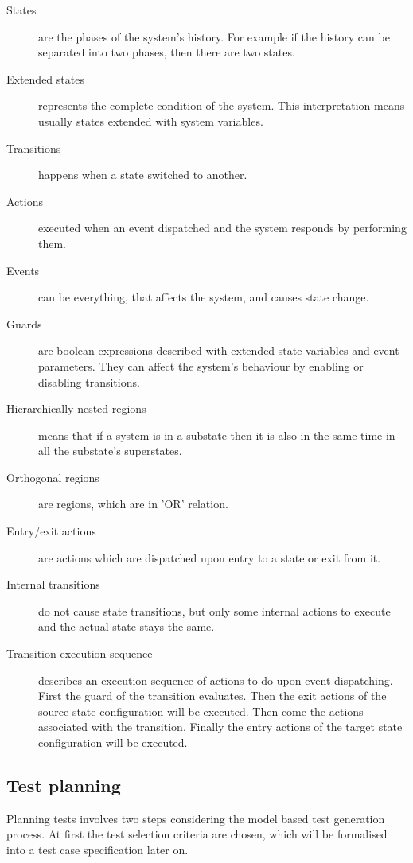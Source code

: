 \begin{description}
	\item[States] are the phases of the system's history. For example if the history can be separated into two phases, then there are two states. 
	\item[Extended states] represents the complete condition of the system. This interpretation means usually states extended with system variables.
	\item[Transitions] happens when a state switched to another.
	\item[Actions] executed when an event dispatched and the system responds by performing them.
	\item[Events] can be everything, that affects the system, and causes state change.
	\item[Guards] are boolean expressions described with extended state variables and event parameters. They can affect the system's behaviour by enabling or disabling transitions.
	\item[Hierarchically nested regions] means that if a system is in a substate then it is also in the same time in all the substate's superstates.
	\item[Orthogonal regions] are regions, which are in 'OR' relation.
	\item[Entry/exit actions] are actions which are dispatched upon entry to a state or exit from it.
	\item[Internal transitions] do not cause state transitions, but only some internal actions to execute and the actual state stays the same.
	\item[Transition execution sequence] describes an execution sequence of actions to do upon event dispatching. First the guard of the transition evaluates. Then the exit actions of the source state configuration will be executed. Then come the actions associated with the transition. Finally the entry actions of the target state configuration will be executed.
\end{description}



\subsection{Test planning}
\label{sub:testplanning}

Planning tests involves two steps considering the model based test generation process. At first the test selection criteria are chosen, which will be formalised into a test case specification later on.

